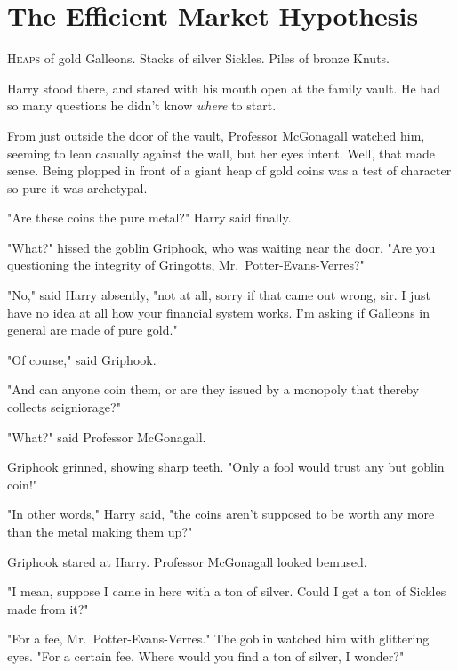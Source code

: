 \chapter[The Efficient Market Hypothesis]{The Efficient Market Hypothesis\protect\footnotemark}


\lettrine{H}{eaps} of gold Galleons. Stacks of silver Sickles. Piles of bronze Knuts.

\quad\quad
Harry stood there, and stared with his mouth open at the family vault. He had
so many questions he didn't know \emph{where} to start.

From just outside the door of the vault, Professor McGonagall watched him,
seeming to lean casually against the wall, but her eyes intent. Well, that made
sense. Being plopped in front of a giant heap of gold coins was a test of
character so pure it was archetypal.

"Are these coins the pure metal?" Harry said finally.

"What?" hissed the goblin Griphook, who was waiting near the door. "Are you
questioning the integrity of Gringotts, Mr.~Potter-Evans-Verres?"

"No," said Harry absently, "not at all, sorry if that came out wrong, sir. I
just have no idea at all how your financial system works. I'm asking if
Galleons in general are made of pure gold."

"Of course," said Griphook.

"And can anyone coin them, or are they issued by a monopoly that thereby
collects seigniorage?"

"What?" said Professor McGonagall.

Griphook grinned, showing sharp teeth. "Only a fool would trust any but goblin
coin!"

"In other words," Harry said, "the coins aren't supposed to be worth any more
than the metal making them up?"

Griphook stared at Harry. Professor McGonagall looked bemused.

"I mean, suppose I came in here with a ton of silver. Could I get a ton of
Sickles made from it?"

"For a fee, Mr.~Potter-Evans-Verres." The goblin watched him with glittering
eyes. "For a certain fee. Where would you find a ton of silver, I wonder?"

